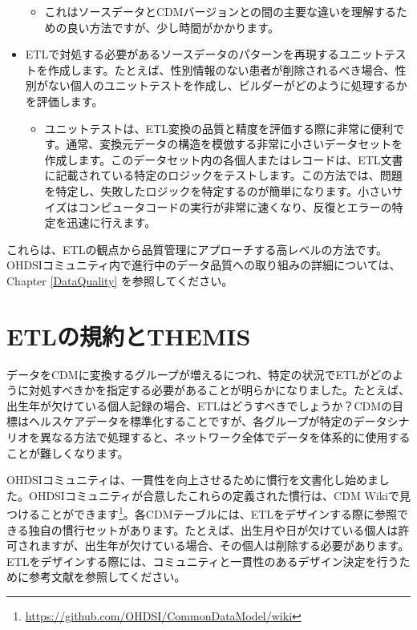 \documentclass[
  11pt]{book}
\providecommand{\tightlist}{%
  \setlength{\itemsep}{0pt}\setlength{\parskip}{0pt}}
\theoremstyle{definition}
\theoremstyle{definition}
\theoremstyle{definition}
\theoremstyle{definition}
\theoremstyle{remark}
\begin{document}
\begin{itemize}
  \begin{itemize}
  \tightlist
  \item
    これはソースデータとCDMバージョンとの間の主要な違いを理解するための良い方法ですが、少し時間がかかります。
  \end{itemize}
\item
  ETLで対処する必要があるソースデータのパターンを再現するユニットテストを作成します。たとえば、性別情報のない患者が削除されるべき場合、性別がない個人のユニットテストを作成し、ビルダーがどのように処理するかを評価します。

  \begin{itemize}
  \tightlist
  \item
    ユニットテストは、ETL変換の品質と精度を評価する際に非常に便利です。通常、変換元データの構造を模倣する非常に小さいデータセットを作成します。このデータセット内の各個人またはレコードは、ETL文書に記載されている特定のロジックをテストします。この方法では、問題を特定し、失敗したロジックを特定するのが簡単になります。小さいサイズはコンピュータコードの実行が非常に速くなり、反復とエラーの特定を迅速に行えます。
  \end{itemize}
\end{itemize}

これらは、ETLの観点から品質管理にアプローチする高レベルの方法です。OHDSIコミュニティ内で進行中のデータ品質への取り組みの詳細については、Chapter \ref{DataQuality} を参照してください。

\section{ETLの規約とTHEMIS}\label{etlux306eux898fux7d04ux3068themis}

データをCDMに変換するグループが増えるにつれ、特定の状況でETLがどのように対処すべきかを指定する必要があることが明らかになりました。たとえば、出生年が欠けている個人記録の場合、ETLはどうすべきでしょうか？CDMの目標はヘルスケアデータを標準化することですが、各グループが特定のデータシナリオを異なる方法で処理すると、ネットワーク全体でデータを体系的に使用することが難しくなります。

OHDSIコミュニティは、一貫性を向上させるために慣行を文書化し始めました。OHDSIコミュニティが合意したこれらの定義された慣行は、CDM Wikiで見つけることができます\footnote{\url{https://github.com/OHDSI/CommonDataModel/wiki}}。各CDMテーブルには、ETLをデザインする際に参照できる独自の慣行セットがあります。たとえば、出生月や日が欠けている個人は許可されますが、出生年が欠けている場合、その個人は削除する必要があります。ETLをデザインする際には、コミュニティと一貫性のあるデザイン決定を行うために参考文献を参照してください。
\end{document}
